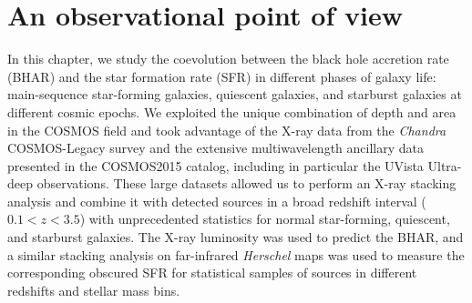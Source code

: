 \chapter{An observational point of view}


In this chapter, we study the coevolution between the black hole accretion rate (BHAR) and the star formation rate (SFR) in different phases of galaxy life: main-sequence star-forming galaxies, quiescent galaxies, and starburst galaxies at different cosmic epochs.
   We exploited the unique combination of depth and area in the COSMOS field and took advantage of the X-ray data from the {\it Chandra} COSMOS-Legacy survey and the extensive multiwavelength ancillary data presented in the COSMOS2015 catalog, including in particular the UVista Ultra-deep observations.
   These large datasets allowed us to perform an X-ray stacking analysis and combine it with detected sources in a broad redshift interval ($0.1<z<3.5$) with unprecedented statistics for normal star-forming, quiescent, and starburst galaxies. 
   The X-ray luminosity was used to predict the BHAR, and a similar stacking analysis on far-infrared {\it Herschel} maps was used to measure the corresponding obscured SFR for statistical samples of sources in different redshifts and stellar mass bins.
   
